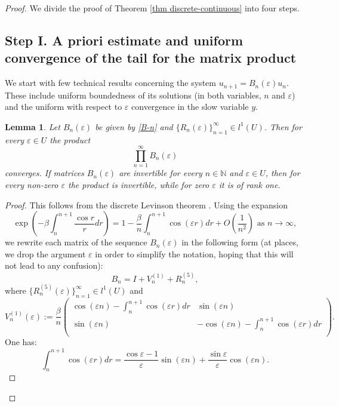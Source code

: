 \documentclass[a4paper,oneside,12pt]{amsart}
\newtheorem{lem}{Lemma}
\begin{document}
\begin{proof}
We divide the proof of Theorem \ref{thm discrete-continuous} into four steps.

\subsection*{Step I. A priori estimate and uniform convergence of the tail for the matrix product}
We start with few technical results concerning the system $u_{n+1}=B_n(\varepsilon)u_n$. These include uniform boundedness of its solutions (in both variables, $n$ and $\varepsilon$) and the uniform with respect to $\varepsilon$ convergence in the slow variable $y$.

    \begin{lem}\label{lem convergence of the product and degeneracy}
    Let $B_n(\varepsilon)$ be given by \eqref{B-n} and $\{R_n(\varepsilon)\}_{n=1}^{\infty}\in l^1(U)$. Then for every $\varepsilon\in U$ the product
    \begin{equation*}
        \prod_{n=1}^{\infty}B_n(\varepsilon)
    \end{equation*}
    converges. If matrices $B_n(\varepsilon)$ are invertible for every $n\in\mathbb N$ and $\varepsilon\in U$, then for every non-zero $\varepsilon$ the product is invertible, while for zero $\varepsilon$ it is of rank one.
    \end{lem}

\begin{proof}
This follows from the discrete Levinson theorem \cite{Benzaid-Lutz-1987}. Using the expansion
\begin{equation}\label{decomposition of the exponent}
    \exp\left(-\beta\int_n^{n+1}\frac{\cos r}rdr\right)=1-\frac{\beta}n\int_n^{n+1}\cos(\varepsilon r)dr+O\left(\frac1{n^2}\right)\text{ as }n\rightarrow\infty,
\end{equation}
we rewrite each matrix of the sequence $B_n(\varepsilon)$ in the following form (at places, we drop the argument $\varepsilon$ in order to simplify the notation, hoping that this will not lead to any confusion):
\begin{equation}\label{B-n form 2}
    B_n=I+V^{(1)}_n+R^{(5)}_n,
\end{equation}
where $\{R^{(5)}_n(\varepsilon)\}_{n=1}^{\infty}\in l^1(U)$ and
\begin{equation}\label{V-1}
    V^{(1)}_n(\varepsilon):=\frac{\beta}n
    \left(
    \begin{array}{cc}
    \cos(\varepsilon n)-\int_n^{n+1}\cos(\varepsilon r)dr & \sin(\varepsilon n) \\
    \sin(\varepsilon n) & -\cos(\varepsilon n)-\int_n^{n+1}\cos(\varepsilon r)dr \\
    \end{array}
    \right).
\end{equation}
One has:
\begin{equation}\label{equality for the integral}
    \int_n^{n+1}\cos(\varepsilon r)dr=\frac{\cos\varepsilon-1}{\varepsilon}\sin(\varepsilon n)+\frac{\sin\varepsilon}{\varepsilon}\cos(\varepsilon n).
\end{equation}


\end{proof}
\end{proof}
\end{document}
